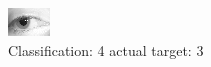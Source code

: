 \begin{figure}[h!]
\begin{center}
\includegraphics[width=0.60\columnwidth]{figures/ID1373_class_4_target_3.png}
\end{center}
\caption{ Classification: 4 actual target: 3}
\label{fig:ID1373_class_4_target_3}
\end{figure}
